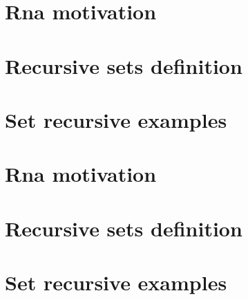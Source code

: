 
\section*{Rna motivation}

\vfill
\section*{Recursive sets definition}

\vfill
\section*{Set recursive examples}

\vfill
\section*{Rna motivation}

\vfill
\section*{Recursive sets definition}

\vfill
\section*{Set recursive examples}

\vfill
